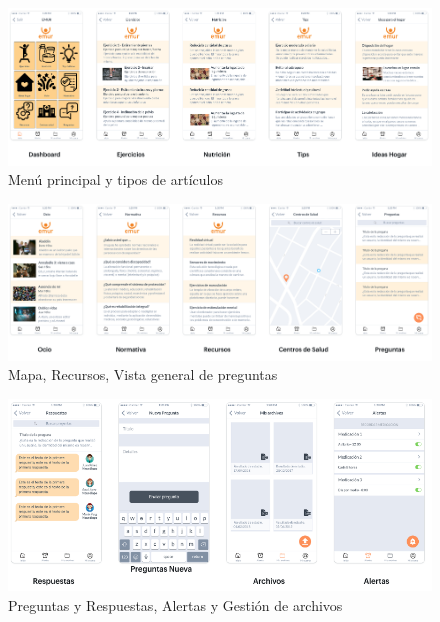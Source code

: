 \begin{figure}[h]
    \centering
    \includegraphics[width=1.1\textwidth]{img/app/diseno_parte3.png}
    \caption{Menú principal y tipos de artículos} \label{Img:Menu+articulos}
\end{figure} 

\begin{figure}[h]
    \centering
    \includegraphics[width=1.1\textwidth]{img/app/diseno_parte4.png}
    \caption{Mapa, Recursos, Vista general de preguntas} \label{Img:Mapa+Recursos}
\end{figure} 

\begin{figure}[h]
    \centering
    \includegraphics[width=1.1\textwidth]{img/app/diseno_parte5.png}
    \caption{Preguntas y Respuestas, Alertas y Gestión de archivos} \label{Img:Preguntas+Respuestas}
\end{figure} 